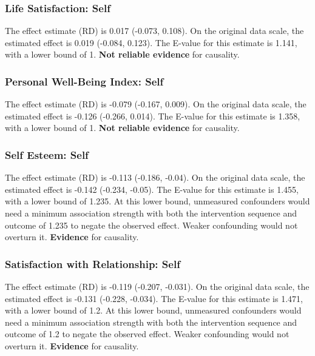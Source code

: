 \documentclass[
  singlecolumn]{article}
\begin{document}
\subsubsection{Life Satisfaction: Self}\label{life-satisfaction-self-17}

The effect estimate (RD) is 0.017 (-0.073, 0.108). On the original data
scale, the estimated effect is 0.019 (-0.084, 0.123). The E-value for
this estimate is 1.141, with a lower bound of 1. \textbf{Not reliable
evidence} for causality.

\subsubsection{Personal Well-Being Index:
Self}\label{personal-well-being-index-self-17}

The effect estimate (RD) is -0.079 (-0.167, 0.009). On the original data
scale, the estimated effect is -0.126 (-0.266, 0.014). The E-value for
this estimate is 1.358, with a lower bound of 1. \textbf{Not reliable
evidence} for causality.

\subsubsection{Self Esteem: Self}\label{self-esteem-self-17}

The effect estimate (RD) is -0.113 (-0.186, -0.04). On the original data
scale, the estimated effect is -0.142 (-0.234, -0.05). The E-value for
this estimate is 1.455, with a lower bound of 1.235. At this lower
bound, unmeasured confounders would need a minimum association strength
with both the intervention sequence and outcome of 1.235 to negate the
observed effect. Weaker confounding would not overturn it.
\textbf{Evidence} for causality.

\subsubsection{Satisfaction with Relationship:
Self}\label{satisfaction-with-relationship-self-17}

The effect estimate (RD) is -0.119 (-0.207, -0.031). On the original
data scale, the estimated effect is -0.131 (-0.228, -0.034). The E-value
for this estimate is 1.471, with a lower bound of 1.2. At this lower
bound, unmeasured confounders would need a minimum association strength
with both the intervention sequence and outcome of 1.2 to negate the
observed effect. Weaker confounding would not overturn it.
\textbf{Evidence} for causality.
\end{document}

